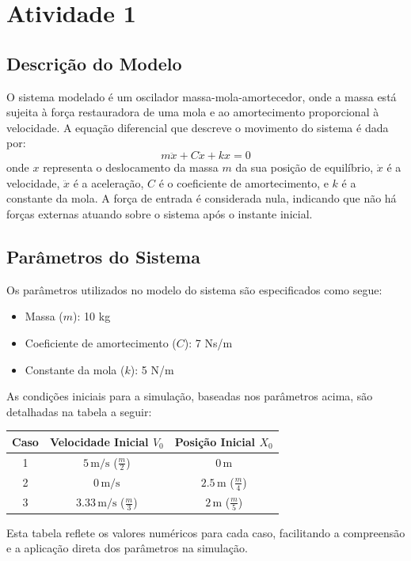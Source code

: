\section{Atividade 1}
\subsection{Descrição do Modelo}
O sistema modelado é um oscilador massa-mola-amortecedor, onde a massa está sujeita à força restauradora de uma mola e ao amortecimento proporcional à velocidade. A equação diferencial que descreve o movimento do sistema é dada por:
\[
m \ddot{x} + C \dot{x} + kx = 0
\]
onde \( x \) representa o deslocamento da massa \( m \) da sua posição de equilíbrio, \( \dot{x} \) é a velocidade, \( \ddot{x} \) é a aceleração, \( C \) é o coeficiente de amortecimento, e \( k \) é a constante da mola. A força de entrada é considerada nula, indicando que não há forças externas atuando sobre o sistema após o instante inicial.

\subsection{Parâmetros do Sistema}
Os parâmetros utilizados no modelo do sistema são especificados como segue:
\begin{itemize}
    \item Massa (\( m \)): 10 kg
    \item Coeficiente de amortecimento (\( C \)): 7 Ns/m
    \item Constante da mola (\( k \)): 5 N/m
\end{itemize}

As condições iniciais para a simulação, baseadas nos parâmetros acima, são detalhadas na tabela a seguir:
\begin{center}
\begin{tabular}{|c|c|c|}
\hline
\textbf{Caso} & \textbf{Velocidade Inicial \( V_0 \)} & \textbf{Posição Inicial \( X_0 \)} \\
\hline
1 & \( 5 \, \text{m/s} \) (\( \frac{m}{2} \)) & \( 0 \, \text{m} \) \\
2 & \( 0 \, \text{m/s} \) & \( 2.5 \, \text{m} \) (\( \frac{m}{4} \)) \\
3 & \( 3.33 \, \text{m/s} \) (\( \frac{m}{3} \)) & \( 2 \, \text{m} \) (\( \frac{m}{5} \)) \\
\hline
\end{tabular}
\end{center}

Esta tabela reflete os valores numéricos para cada caso, facilitando a compreensão e a aplicação direta dos parâmetros na simulação.

